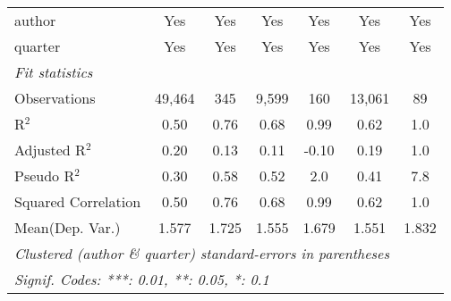 \begin{tabular}{lcccccc}
   author                                                     & Yes            & Yes           & Yes            & Yes           & Yes           & Yes\\  
   quarter                                                    & Yes            & Yes           & Yes            & Yes           & Yes           & Yes\\  
   \midrule
   \emph{Fit statistics}\\
   Observations                                               & 49,464         & 345           & 9,599          & 160           & 13,061        & 89\\  
   R$^2$                                                      & 0.50           & 0.76          & 0.68           & 0.99          & 0.62          & 1.0\\  
   Adjusted R$^2$                                             & 0.20           & 0.13          & 0.11           & -0.10         & 0.19          & 1.0\\  
   Pseudo R$^2$                                               & 0.30           & 0.58          & 0.52           & 2.0           & 0.41          & 7.8\\  
   Squared Correlation                                        & 0.50           & 0.76          & 0.68           & 0.99          & 0.62          & 1.0\\  
Mean(Dep. Var.) & 1.577 & 1.725 & 1.555 & 1.679 & 1.551 & 1.832 \\
   \midrule \midrule
   \multicolumn{7}{l}{\emph{Clustered (author \& quarter) standard-errors in parentheses}}\\
   \multicolumn{7}{l}{\emph{Signif. Codes: ***: 0.01, **: 0.05, *: 0.1}}\\
\end{tabular}
\par\endgroup

